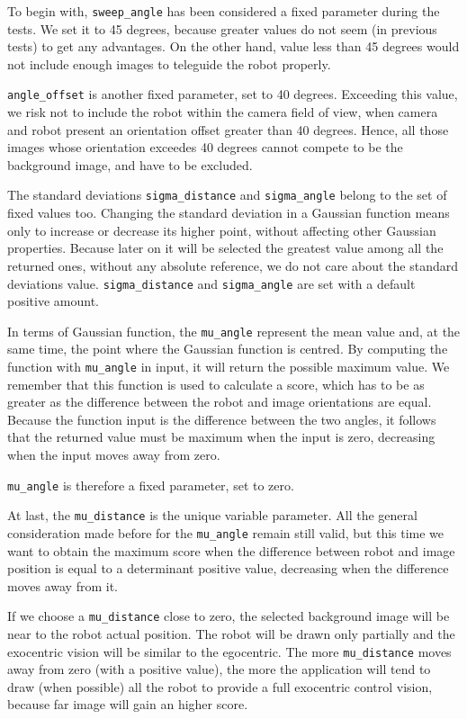 %

%

%
To begin with, \texttt{sweep\_angle} has been considered a fixed parameter during the tests. We set it to 45 degrees,
because greater values do not seem (in previous tests) to get any advantages. On the other hand, value less than 45
degrees would not include enough images to teleguide the robot properly.
%

%
\texttt{angle\_offset} is another fixed parameter, set to 40 degrees. Exceeding this value, we risk not to include
the robot within the camera field of view, when camera and robot present an orientation offset greater than 40 degrees.
Hence, all those images whose orientation exceedes 40 degrees cannot compete to be the background image, 
and have to be excluded.
%

%
The standard deviations \texttt{sigma\_distance} and \texttt{sigma\_angle} belong to the set of
fixed values too. Changing the standard deviation in a Gaussian function means only to increase or decrease its higher
point, without affecting other Gaussian properties. Because later on it will be selected the greatest value among
all the returned ones, without any absolute reference, we do not care about the standard deviations value.
\texttt{sigma\_distance} and \texttt{sigma\_angle} are set with a default positive amount.
%

%
In terms of Gaussian function, the \texttt{mu\_angle} represent the mean value and, at the same time, the point where
the Gaussian function is centred. By computing the function with \texttt{mu\_angle} in input, it will return the possible
maximum value. We remember that this function is used to calculate a score, which has to be as greater as the difference
between the robot and image orientations are equal. Because the function input is the difference between the two angles, it
follows that the returned value must be maximum when the input is zero, decreasing when the input moves away from zero.
%

%
\texttt{mu\_angle} is therefore a fixed parameter, set to zero.
%

%
At last, the \texttt{mu\_distance} is the unique variable parameter. All the general consideration made before for the 
\texttt{mu\_angle} remain still valid, but this time we want to obtain the maximum score when the difference between
robot and image position is equal to a determinant positive value, decreasing when the difference moves away from it.
%

%
If we choose a \texttt{mu\_distance} close to zero, the selected background image will be near to the robot actual position.
The robot will be drawn only partially and the exocentric vision will be similar to the egocentric. The more
\texttt{mu\_distance} moves away from zero (with a positive value), the more the application will tend to draw
(when possible) all the robot to provide a full exocentric control vision, because far image will gain an higher score.
%
